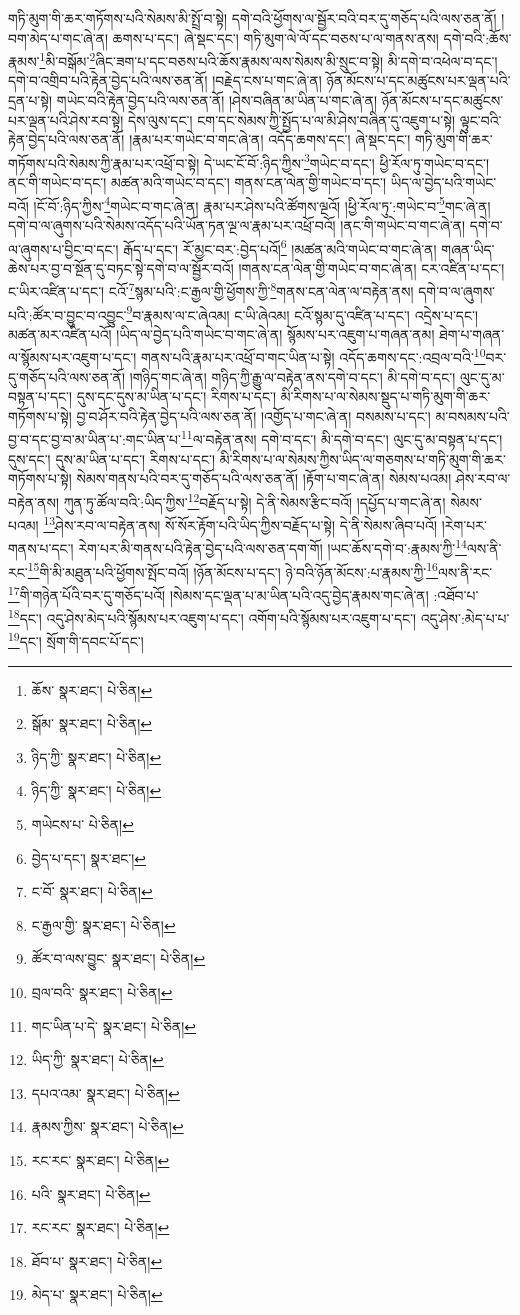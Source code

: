 གཏི་མུག་གི་ཆར་གཏོགས་པའི་སེམས་མི་སྤྲོ་བ་སྟེ། དགེ་བའི་ཕྱོགས་ལ་སྦྱོར་བའི་བར་དུ་གཅོད་པའི་ལས་ཅན་ནོ། །བག་མེད་པ་གང་ཞེ་ན། ཆགས་པ་དང་། ཞེ་སྡང་དང་། གཏི་མུག་ལེ་ལོ་དང་བཅས་པ་ལ་གནས་ནས། དགེ་བའི་:ཆོས་རྣམས་\footnote{ཆོས་  སྣར་ཐང་།  པེ་ཅིན། }མི་བསྒོམ་\footnote{སྒོམ་  སྣར་ཐང་།  པེ་ཅིན། }ཞིང་ཟག་པ་དང་བཅས་པའི་ཆོས་རྣམས་ལས་སེམས་མི་སྲུང་བ་སྟེ། མི་དགེ་བ་འཕེལ་བ་དང་། དགེ་བ་འགྲིབ་པའི་རྟེན་བྱེད་པའི་ལས་ཅན་ནོ། །བརྗེད་ངས་པ་གང་ཞེ་ན། ཉོན་མོངས་པ་དང་མཚུངས་པར་ལྡན་པའི་དྲན་པ་སྟེ། གཡེང་བའི་རྟེན་བྱེད་པའི་ལས་ཅན་ནོ། །ཤེས་བཞིན་མ་ཡིན་པ་གང་ཞེ་ན། ཉོན་མོངས་པ་དང་མཚུངས་པར་ལྡན་པའི་ཤེས་རབ་སྟེ། དེས་ལུས་དང་། ངག་དང་སེམས་ཀྱི་སྤྱོད་པ་ལ་མི་ཤེས་བཞིན་དུ་འཇུག་པ་སྟེ། ལྟུང་བའི་རྟེན་བྱེད་པའི་ལས་ཅན་ནོ། །རྣམ་པར་གཡེང་བ་གང་ཞེ་ན། འདོད་ཆགས་དང་། ཞེ་སྡང་དང་། གཏི་མུག་གི་ཆར་གཏོགས་པའི་སེམས་ཀྱི་རྣམ་པར་འཕྲོ་བ་སྟེ། དེ་ཡང་ངོ་བོ་:ཉིད་ཀྱིས་\footnote{ཉིད་ཀྱི་  སྣར་ཐང་།  པེ་ཅིན། }གཡེང་བ་དང་། ཕྱི་རོལ་ཏུ་གཡེང་བ་དང་། ནང་གི་གཡེང་བ་དང་། མཚན་མའི་གཡེང་བ་དང་། གནས་ངན་ལེན་གྱི་གཡེང་བ་དང་། ཡིད་ལ་བྱེད་པའི་གཡེང་བའོ། །ངོ་བོ་:ཉིད་ཀྱིས་\footnote{ཉིད་ཀྱི་  སྣར་ཐང་།  པེ་ཅིན། }གཡེང་བ་གང་ཞེ་ན། རྣམ་པར་ཤེས་པའི་ཚོགས་ལྔའོ། །ཕྱི་རོལ་ཏུ་:གཡེང་བ་\footnote{གཡེངས་པ་  པེ་ཅིན། }གང་ཞེ་ན། དགེ་བ་ལ་ཞུགས་པའི་སེམས་འདོད་པའི་ཡོན་ཏན་ལྔ་ལ་རྣམ་པར་འཕྲོ་བའོ། །ནང་གི་གཡེང་བ་གང་ཞེ་ན། དགེ་བ་ལ་ཞུགས་པ་བྱིང་བ་དང་། རྒོད་པ་དང་། རོ་མྱང་བར་:བྱེད་པའོ།\footnote{བྱེད་པ་དང་།  སྣར་ཐང་། } །མཚན་མའི་གཡེང་བ་གང་ཞེ་ན། གཞན་ཡིད་ཆེས་པར་བྱ་བ་སྔོན་དུ་བཏང་སྟེ་དགེ་བ་ལ་སྦྱོར་བའོ། །གནས་ངན་ལེན་གྱི་གཡེང་བ་གང་ཞེ་ན། ངར་འཛིན་པ་དང་། ང་ཡིར་འཛིན་པ་དང་། ངའོ་\footnote{ང་བོ་  སྣར་ཐང་།  པེ་ཅིན། }སྙམ་པའི་:ང་རྒྱལ་གྱི་ཕྱོགས་ཀྱི་\footnote{ང་རྒྱལ་གྱི་  སྣར་ཐང་།  པེ་ཅིན། }གནས་ངན་ལེན་ལ་བརྟེན་ནས། དགེ་བ་ལ་ཞུགས་པའི་:ཚོར་བ་བྱུང་བ་འབྱུང་\footnote{ཚོར་བ་ལས་བྱུང་  སྣར་ཐང་།  པེ་ཅིན། }བ་རྣམས་ལ་ང་ཞེའམ། ང་ཡི་ཞེའམ། ངའོ་སྙམ་དུ་འཛིན་པ་དང་། འདྲེས་པ་དང་། མཚན་མར་འཛིན་པའོ། །ཡིད་ལ་བྱེད་པའི་གཡེང་བ་གང་ཞེ་ན། སྙོམས་པར་འཇུག་པ་གཞན་ནམ། ཐེག་པ་གཞན་ལ་སྙོམས་པར་འཇུག་པ་དང་། གནས་པའི་རྣམ་པར་འཕྲོ་བ་གང་ཡིན་པ་སྟེ། འདོད་ཆགས་དང་:འབྲལ་བའི་\footnote{བྲལ་བའི་  སྣར་ཐང་།  པེ་ཅིན། }བར་དུ་གཅོད་པའི་ལས་ཅན་ནོ། །གཉིད་གང་ཞེ་ན། གཉིད་ཀྱི་རྒྱུ་ལ་བརྟེན་ནས་དགེ་བ་དང་། མི་དགེ་བ་དང་། ལུང་དུ་མ་བསྟན་པ་དང་། དུས་དང་དུས་མ་ཡིན་པ་དང་། རིགས་པ་དང་། མི་རིགས་པ་ལ་སེམས་སྡུད་པ་གཏི་མུག་གི་ཆར་གཏོགས་པ་སྟེ། བྱ་བ་ཤོར་བའི་རྟེན་བྱེད་པའི་ལས་ཅན་ནོ། །འགྱོད་པ་གང་ཞེ་ན། བསམས་པ་དང་། མ་བསམས་པའི་བྱ་བ་དང་བྱ་བ་མ་ཡིན་པ་:གང་ཡིན་པ་\footnote{གང་ཡིན་པ་དེ་  སྣར་ཐང་།  པེ་ཅིན། }ལ་བརྟེན་ནས། དགེ་བ་དང་། མི་དགེ་བ་དང་། ལུང་དུ་མ་བསྟན་པ་དང་། དུས་དང་། དུས་མ་ཡིན་པ་དང་། རིགས་པ་དང་། མི་རིགས་པ་ལ་སེམས་ཀྱིས་ཡིད་ལ་གཅགས་པ་གཏི་མུག་གི་ཆར་གཏོགས་པ་སྟེ། སེམས་གནས་པའི་བར་དུ་གཅོད་པའི་ལས་ཅན་ནོ། །རྟོག་པ་གང་ཞེ་ན། སེམས་པའམ། ཤེས་རབ་ལ་བརྟེན་ནས། ཀུན་ཏུ་ཚོལ་བའི་:ཡིད་ཀྱིས་\footnote{ཡིད་ཀྱི་  སྣར་ཐང་།  པེ་ཅིན། }བརྗོད་པ་སྟེ། དེ་ནི་སེམས་རྩིང་བའོ། །དཔྱོད་པ་གང་ཞེ་ན། སེམས་པའམ། \footnote{དཔའ་འམ་  སྣར་ཐང་།  པེ་ཅིན། }ཤེས་རབ་ལ་བརྟེན་ནས། སོ་སོར་རྟོག་པའི་ཡིད་ཀྱིས་བརྗོད་པ་སྟེ། དེ་ནི་སེམས་ཞིབ་པའོ། །རེག་པར་གནས་པ་དང་། རེག་པར་མི་གནས་པའི་རྟེན་བྱེད་པའི་ལས་ཅན་དག་གོ། །ཡང་ཆོས་དགེ་བ་:རྣམས་ཀྱི་\footnote{རྣམས་ཀྱིས་  སྣར་ཐང་།  པེ་ཅིན། }ལས་ནི་རང་\footnote{རང་རང་  སྣར་ཐང་།  པེ་ཅིན། }གི་མི་མཐུན་པའི་ཕྱོགས་སྤོང་བའོ། །ཉོན་མོངས་པ་དང་། ཉེ་བའི་ཉོན་མོངས་:པ་རྣམས་ཀྱི་\footnote{པའི་  སྣར་ཐང་།  པེ་ཅིན། }ལས་ནི་རང་\footnote{རང་རང་  སྣར་ཐང་།  པེ་ཅིན། }གི་གཉེན་པོའི་བར་དུ་གཅོད་པའོ། །སེམས་དང་ལྡན་པ་མ་ཡིན་པའི་འདུ་བྱེད་རྣམས་གང་ཞེ་ན། :འཐོབ་པ་\footnote{ཐོབ་པ་  སྣར་ཐང་།  པེ་ཅིན། }དང་། འདུ་ཤེས་མེད་པའི་སྙོམས་པར་འཇུག་པ་དང་། འགོག་པའི་སྙོམས་པར་འཇུག་པ་དང་། འདུ་ཤེས་:མེད་པ་པ་\footnote{མེད་པ་  སྣར་ཐང་།  པེ་ཅིན། }དང་། སྲོག་གི་དབང་པོ་དང་། 